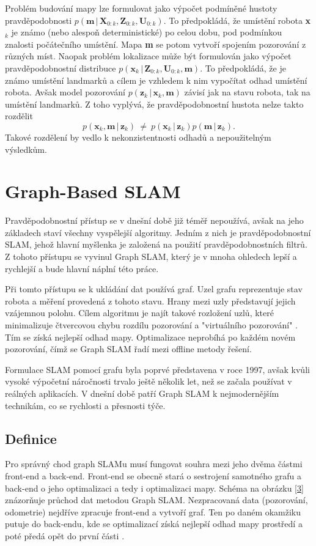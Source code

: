 \documentclass[12pt,a4paper]{report}
\begin{document}
Problém budování mapy lze formulovat jako výpočet podmíněné hustoty pravdě\-podobnosti $p(\textbf{m} \,|\, \textbf{X}_{0:k}, \textbf{Z}_{0:k}, \textbf{U}_{0:k})$. To předpokládá, že umístění robota \textbf{x}$_k$ je známo (nebo alespoň deterministické) po celou dobu, pod podmínkou znalosti počátečního umístění. Mapa \textbf{m} se potom vytvoří spojením pozorování z různých míst. Naopak problém lokalizace může být formulován jako výpočet pravděpodobnostní distribuce $p(\textbf{x}_k \,|\, \textbf{Z}_{0:k}, \textbf{U}_{0:k}, \textbf{m})$. To předpokládá, že je známo umístění landmarků a cílem je vzhledem k nim vypočítat odhad umístění robota. Avšak model pozorování $p(\textbf{z}_k \,|\, \textbf{x}_k, \textbf{m})$ závisí jak na stavu robota, tak na umístění landmarků. Z toho vyplývá, že pravděpodobnostní hustota nelze takto rozdělit
$$
p(\textbf{x}_k, \textbf{m} \,|\, \textbf{z}_k) \: \ne \: p(\textbf{x}_k \,|\, \textbf{z}_k)p(\textbf{m} \,|\, \textbf{z}_k).
$$
Takové rozdělení by vedlo k nekonzistentnosti odhadů a nepoužitelným výsledkům. 

\chapter{Graph-Based SLAM}
Pravděpodobnostní přístup se v dnešní době již téměř nepoužívá, avšak na jeho základech staví všechny vyspělejší algoritmy. Jedním z nich je pravděpodobnostní SLAM, jehož hlavní myšlenka je založená na použití pravděpodobnostních filtrů. Z tohoto přístupu se vyvinul Graph SLAM, který je v mnoha ohledech lepší a rychlejší a bude hlavní náplní této práce. 

Při tomto přístupu se k ukládání dat používá graf. Uzel grafu reprezentuje stav robota a měření provedená z tohoto stavu. Hrany mezi uzly představují jejich vzájemnou polohu. Cílem algoritmu je najít takové rozložení uzlů, které minimalizuje čtvercovou chybu rozdílu pozorování a "virtuálního pozorování" \cite{tutorialGraph}. Tím se získá nejlepší odhad mapy. Optimalizace neprobíhá po každém novém pozorování, čímž se Graph SLAM řadí mezi offline metody řešení.

Formulace SLAM pomocí grafu byla poprvé představena v roce 1997, avšak kvůli vysoké výpočetní náročnosti trvalo ještě několik let, než se začala používat v reálných aplikacích. V dnešní době patří Graph SLAM k nejmodernějším technikám, co se rychlosti a přesnosti týče.

\section{Definice}
Pro správný chod graph SLAMu musí fungovat souhra mezi jeho dvěma částmi front-end a back-end. Front-end se obecně stará o sestrojení samotného grafu a back-end o jeho optimalizaci a tedy i optimalizaci mapy. Schéma na obrázku \ref{3} znázorňuje průchod dat metodou Graph SLAM. Nezpracovaná data (pozorování, odometrie) nejdříve zpracuje front-end a vytvoří graf. Ten po daném okamžiku putuje do back-endu, kde se optimalizací získá nejlepší odhad mapy prostředí a poté předá opět do první části \cite{tutorialGraph}.
\end{document}
